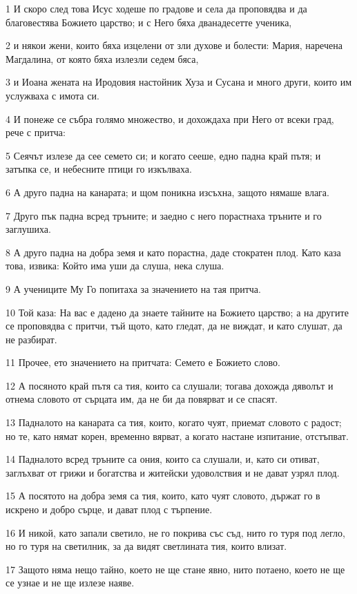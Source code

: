 \par 1 И скоро след това Исус ходеше по градове и села да проповядва и да благовестява Божието царство; и с Него бяха дванадесетте ученика,
\par 2 и някои жени, които бяха изцелени от зли духове и болести: Мария, наречена Магдалина, от която бяха излезли седем бяса,
\par 3 и Иоана жената на Иродовия настойник Хуза и Сусана и много други, които им услужваха с имота си.
\par 4 И понеже се събра голямо множество, и дохождаха при Него от всеки град, рече с притча:
\par 5 Сеячът излезе да сее семето си; и когато сееше, едно падна край пътя; и затъпка се, и небесните птици го изкълваха.
\par 6 А друго падна на канарата; и щом поникна изсъхна, защото нямаше влага.
\par 7 Друго пък падна всред тръните; и заедно с него порастнаха тръните и го заглушиха.
\par 8 А друго падна на добра земя и като порастна, даде стократен плод. Като каза това, извика: Който има уши да слуша, нека слуша.
\par 9 А учениците Му Го попитаха за значението на тая притча.
\par 10 Той каза: На вас е дадено да знаете тайните на Божието царство; а на другите се проповядва с притчи, тъй щото, като гледат, да не виждат, и като слушат, да не разбират.
\par 11 Прочее, ето значението на притчата: Семето е Божието слово.
\par 12 А посяното край пътя са тия, които са слушали; тогава дохожда дяволът и отнема словото от сърцата им, да не би да повярват и се спасят.
\par 13 Падналото на канарата са тия, които, когато чуят, приемат словото с радост; но те, като нямат корен, временно вярват, а когато настане изпитание, отстъпват.
\par 14 Падналото всред тръните са ония, които са слушали, и, като си отиват, заглъхват от грижи и богатства и житейски удоволствия и не дават узрял плод.
\par 15 А посятото на добра земя са тия, които, като чуят словото, държат го в искрено и добро сърце, и дават плод с търпение.
\par 16 И никой, като запали светило, не го покрива със съд, нито го туря под легло, но го туря на светилник, за да видят светлината тия, които влизат.
\par 17 Защото няма нещо тайно, което не ще стане явно, нито потаено, което не ще се узнае и не ще излезе наяве.
